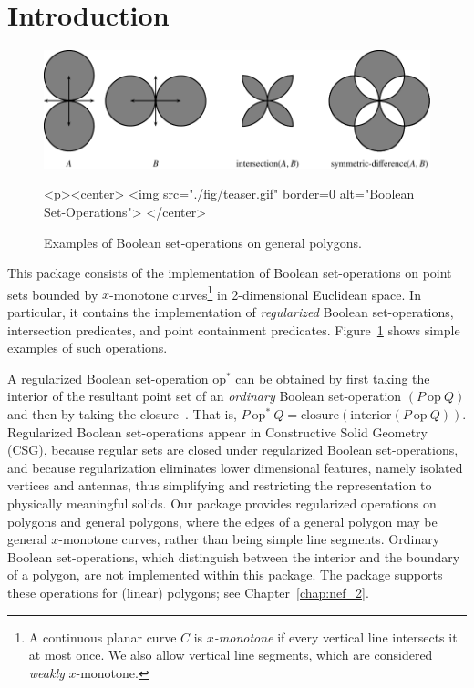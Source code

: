 \section{Introduction}
\label{bso_sec:intro}

\begin{figure}[!htp]
\begin{center}
\begin{ccTexOnly}
  \includegraphics{Boolean_set_operations_2/fig/teaser}
\end{ccTexOnly}
\label{fig:teaser}
\begin{ccHtmlOnly}
  <p><center>
    <img src="./fig/teaser.gif" border=0 alt="Boolean Set-Operations">
  </center>
\end{ccHtmlOnly}
\caption{Examples of Boolean set-operations on general polygons.} 
\end{center}
\end{figure}

This package consists of the implementation of Boolean set-operations
on point sets bounded by $x$-monotone curves\footnote{A continuous
planar curve $C$ is {\em $x$-monotone} if every vertical line intersects it at
most once. We also allow vertical line segments, which are considered
{\em weakly} $x$-monotone.} in 2-dimensional Euclidean space. In particular,
it contains the implementation of {\em regularized} Boolean set-operations,
intersection predicates, and point containment predicates.
Figure~\ref{fig:teaser} shows simple examples of such operations.

A regularized Boolean set-operation $\mbox{op}^*$ can be obtained by
first taking the interior of the resultant point set of an {\em ordinary}
Boolean set-operation $(P\ \mbox{op}\ Q)$ and then by taking the
closure~\cite{cgal:h-sm-04}. That is,
$P\ \mbox{op}^*\ Q = \mbox{closure}(\mbox{interior} (P\ \mbox{op}\ Q))$.
Regularized Boolean set-operations appear in Constructive Solid
Geometry (CSG), because regular sets are closed under regularized
Boolean set-operations, and because regularization eliminates lower
dimensional features, namely isolated vertices and antennas, thus
simplifying and restricting the representation to physically meaningful
solids. Our package provides regularized operations on polygons and
general polygons, where the edges of a general polygon may be
general $x$-monotone curves, rather than being simple line segments.
Ordinary Boolean set-operations, which distinguish between the
interior and the boundary of a polygon, are not implemented within this
package. The  package supports these operations for (linear)
polygons; see Chapter~\ref{chap:nef_2}.

